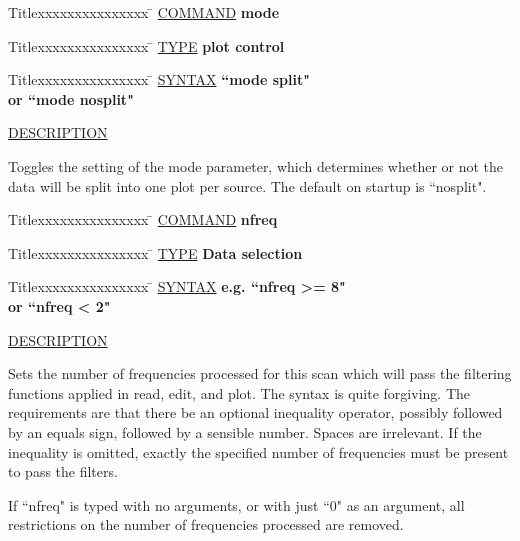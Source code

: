 \begin{tabbing}
Titlexxxxxxxxxxxxxxx \= \kill
\underline{COMMAND} \> {\bf 	mode} \\
\end{tabbing}

\begin{tabbing}
Titlexxxxxxxxxxxxxxx \= \kill
\underline{TYPE} \> {\bf 		plot control} \\
\end{tabbing}

\begin{tabbing}
Titlexxxxxxxxxxxxxxx \= \kill
\underline{SYNTAX} \> {\bf 		``mode split"} \\
\> {\bf 	    or  ``mode nosplit"} \\
\end{tabbing}

\underline{DESCRIPTION}
\begin{list}{}{\setlength{\leftmargin}{0.5in}
     \setlength{\rightmargin}{0in}}
\item
Toggles the setting of the mode parameter, which determines
whether or not the data will be split into one plot per
source.  The default on startup is ``nosplit".
\end{list}
\vspace{.2in}

\begin{tabbing}
Titlexxxxxxxxxxxxxxx \= \kill
\underline{COMMAND} \> {\bf 	nfreq} \\
\end{tabbing}

\begin{tabbing}
Titlexxxxxxxxxxxxxxx \= \kill
\underline{TYPE} \> {\bf 		Data selection} \\
\end{tabbing}

\begin{tabbing}
Titlexxxxxxxxxxxxxxx \= \kill
\underline{SYNTAX} \> {\bf 	  e.g.	``nfreq >= 8"} \\
\> {\bf 	    or	``nfreq < 2"} \\
\end{tabbing}

\underline{DESCRIPTION}
\begin{list}{}{\setlength{\leftmargin}{0.5in}
     \setlength{\rightmargin}{0in}}
\item
Sets the number of frequencies processed for this scan which
will pass the filtering functions applied in read, edit, and
plot.  The syntax is quite forgiving.  The requirements are
that there be an optional inequality operator, possibly followed 
by an equals sign, followed by a sensible number.  Spaces are 
irrelevant.  If the inequality is omitted, exactly the specified
number of frequencies must be present to pass the filters.
\item
If ``nfreq" is typed with no arguments, or with just ``0" as an 
argument, all restrictions on the number of frequencies 
processed are removed.
\item
\end{list}
\vspace{.2in}

